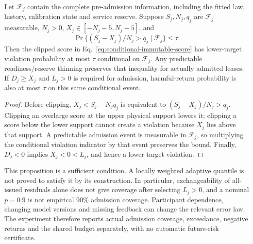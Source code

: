 \begin{proposition}
\label{prop:conditional-error-quantile}
Let $\mathcal F_j$ contain the complete pre-admission information,
including the fitted law, history, calibration state and service reserve.
Suppose $S_j,N_j,q_j$ are $\mathcal F_j$ measurable, $N_j>0$,
$X_j\in[-N_j-5,N_j-5]$, and
\begin{equation}
 \Pr\{(S_j-X_j)/N_j>q_j\mid\mathcal F_j\}\leq\tau.
 \label{eq:valid-conditional-residual-quantile}
\end{equation}
Then the clipped score in Eq.~\eqref{eq:conditional-immutable-score}
has lower-target violation probability at most $\tau$ conditional on
$\mathcal F_j$. Any predictable readiness/reserve thinning preserves
that inequality for actually admitted leases. If $D_j\geq X_j$ and
$L_j>0$ is required for admission, harmful-return probability is also
at most $\tau$ on this same conditional event.
\end{proposition}
\begin{proof}
Before clipping, $X_j<S_j-N_jq_j$ is equivalent to
$(S_j-X_j)/N_j>q_j$. Clipping an overlarge score at the upper physical
support lowers it; clipping a score below the lower support cannot create
a violation because $X_j$ lies above that support. A predictable admission
event is measurable in $\mathcal F_j$, so multiplying the conditional
violation indicator by that event preserves the bound. Finally,
$D_j<0$ implies $X_j<0<L_j$, and hence a lower-target violation.
\end{proof}

This proposition is a sufficient condition. A locally weighted adaptive
quantile is not proved to satisfy it by its construction. In particular,
exchangeability of all-issued residuals alone does not give coverage after
selecting $L_j>0$, and a nominal $p=0.9$ is not empirical 90\% admission
coverage. Participant dependence, changing model versions and missing
feedback can change the relevant error law. The experiment therefore
reports actual admission coverage, exceedance, negative returns and the
shared budget separately, with no automatic future-risk certificate.

